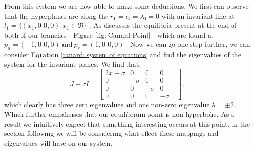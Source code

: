 From this system we are now able to make some deductions. We first can observe that the hyperplanes are along the $r_1=\epsilon_1=\lambda_1=0$ with an invariant line at $l_1=\{(x_1,0,0,0): x_1\in\Re\}$ \citep{krupa2001}. As \citet{krupa2001} discusses the equilibria present at the end of both of our branches - Figure \ref{fig: Canard Point} - which are found at $p_a=(-1,0,0,0) \ \text{and} \ p_r=(1,0,0,0)$ \citep{krupa2001}. Now we can go one step further, we can consider Equation \ref{canard: system of equations} and find the eigenvalues of the system for the invariant planes. We find that, 
\begin{equation}
J-\sigma I= \begin{bmatrix}
2x-\sigma & 0 & 0 & 0  \\
0 & -\sigma & 0 & 0&\\
0 & 0 & -\sigma & 0 \\
0 & 0 & 0 & -\sigma
\end{bmatrix},
\end{equation}
which clearly has three zero eigenvalues and one non-zero eigenvalue $\lambda=\pm 2$. Which further empahsises that our equilibrium point is non-hyperbolic. As a result we intuitively expect that something interesting occurs at this point. In the section following we will be considering what effect these mappings and eigenvalues will have on our system.


